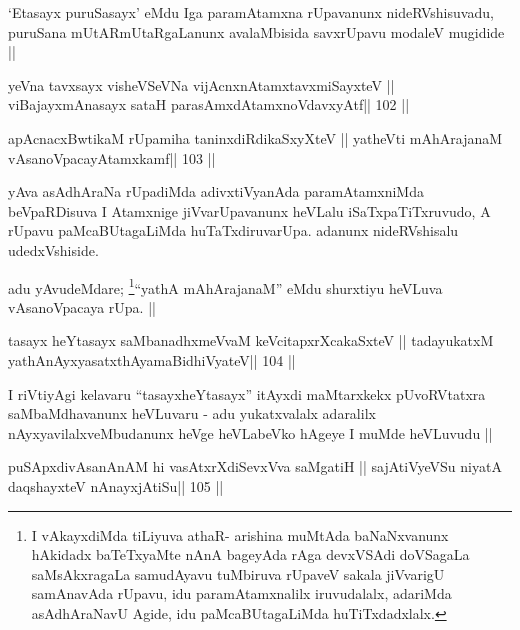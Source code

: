 \begin{artha}
`Etasayx puruSasayx' eMdu Iga paramAtamxna rUpavanunx nideRVshisuvadu,
  puruSana mUtARmUtaRgaLanunx avalaMbisida savxrUpavu modaleV
  mugidide ||
\end{artha}

\begin{shl}
yeVna tavxsayx visheVSeVNa vijAcnxnAtamxtavxmiSayxteV ||
viBajayxmAnasayx sataH parasAmxdAtamxnoV\s davxyAtf\hfill || 102 ||
\end{shl}

\begin{shl}
apAcnacxBwtikaM rUpamiha taninxdiRdikaSxyXteV ||
yatheVti mAhArajanaM vAsanoVpacayAtamxkamf\hfill || 103 ||
\end{shl}

\begin{artha}
yAva asAdhAraNa rUpadiMda adivxtiVyanAda paramAtamxniMda beVpaRDisuva
I Atamxnige jiVvarUpavanunx heVLalu iSaTxpaTiTxruvudo, A rUpavu
paMcaBUtagaLiMda huTaTxdiruvarUpa. adanunx nideRVshisalu udedxVshiside.
\end{artha}

\begin{artha}
adu yAvudeMdare; \footnote[1]{I vAkayxdiMda tiLiyuva athaR- arishina
  muMtAda baNaNxvanunx hAkidadx baTeTxyaMte nAnA bageyAda rAga
  devxVSAdi doVSagaLa saMsAkxragaLa samudAyavu tuMbiruva
  rUpaveV sakala jiVvarigU samAnavAda rUpavu, idu paramAtamxnalilx
  iruvudalalx, adariMda asAdhAraNavU Agide, idu paMcaBUtagaLiMda 
  huTiTxdadxlalx.}``yathA mAhArajanaM'' eMdu shurxtiyu
heVLuva vAsanoVpacaya rUpa. ||
\end{artha}


\begin{shl}
tasayx heYtasayx saMbanadhxmeVvaM keVcitapxrXcakaSxteV ||
tadayukatxM yathA\s nAyxyasatxthA\s yamaBidhiVyateV\hfill || 104 ||
\end{shl}

\begin{artha}
I riVtiyAgi kelavaru ``tasayxheYtasayx'' itAyxdi maMtarxkekx
pUvoRVtatxra saMbaMdhavanunx heVLuvaru - adu yukatxvalalx adaralilx
nAyxyavilalxveMbudanunx heVge heVLabeVko hAgeye I muMde heVLuvudu ||
\end{artha}



\begin{shl}
puSApxdivAsanAnAM hi vasAtxrXdiSevxVva saMgatiH ||
sajAtiVyeVSu niyatA daqshayxteV nAnayxjAtiSu\hfill || 105 ||
\end{shl}

